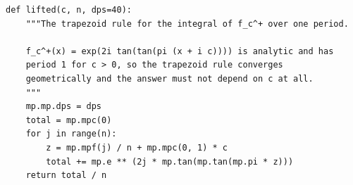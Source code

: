 \begin{verbatim}
def lifted(c, n, dps=40):
    """The trapezoid rule for the integral of f_c^+ over one period.

    f_c^+(x) = exp(2i tan(tan(pi (x + i c)))) is analytic and has
    period 1 for c > 0, so the trapezoid rule converges
    geometrically and the answer must not depend on c at all.
    """
    mp.mp.dps = dps
    total = mp.mpc(0)
    for j in range(n):
        z = mp.mpf(j) / n + mp.mpc(0, 1) * c
        total += mp.e ** (2j * mp.tan(mp.tan(mp.pi * z)))
    return total / n
\end{verbatim}
